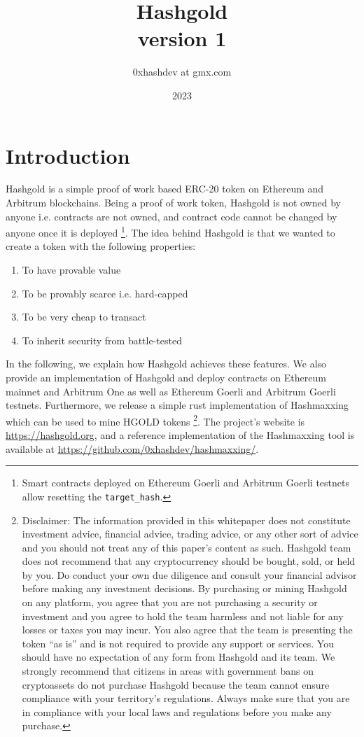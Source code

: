 \documentclass[12pt, a4paper]{article}
\title{{\Huge Hashgold} \\
{\large version 1} }
\author{0xhashdev at gmx.com}
\date{2023}
\newcommand{\websitelink}{\href{https://hashgold.org}{https://hashgold.org}}
\newcommand{\githublink}{\href{https://github.com/0xhashdev/hashmaxxing/}{https://github.com/0xhashdev/hashmaxxing/}}
\begin{document}
\maketitle

\section{Introduction}
Hashgold is a simple proof of work based ERC-20 token on Ethereum and Arbitrum blockchains. Being a proof of work token, Hashgold is not owned by anyone i.e. contracts are not owned, and contract code cannot be changed by anyone once it is deployed \footnote{Smart contracts deployed on Ethereum Goerli and Arbitrum Goerli testnets allow resetting the \texttt{target\_hash}.}. The idea behind Hashgold is that we wanted to create a token with the following properties:
\begin{enumerate}
    \item To have provable value
    \item To be provably scarce i.e. hard-capped
    \item To be very cheap to transact
    \item To inherit security from battle-tested 
\end{enumerate}
In the following, we explain how Hashgold achieves these features. We also provide an implementation of Hashgold and deploy contracts on Ethereum mainnet and Arbitrum One as well as Ethereum Goerli and Arbitrum Goerli testnets. Furthermore, we release a simple rust implementation of Hashmaxxing which can be used to mine HGOLD tokens
\footnote{Disclaimer: The information provided in this whitepaper does not constitute investment advice, financial advice, trading advice, or any other sort of advice and you should not treat any of this paper's content as such. 
Hashgold team does not recommend that any cryptocurrency should be bought, sold, or held by you. Do conduct your own due diligence and consult your financial advisor before making any investment decisions.
By purchasing or mining Hashgold on any platform, you agree that you are not purchasing a security or investment and you agree to hold the team harmless and not liable for any losses or taxes you may incur. 
You also agree that the team is presenting the token ``as is'' and is not required to provide any support or services. 
You should have no expectation of any form from Hashgold and its team. 
We strongly recommend that citizens in areas with government bans on cryptoassets do not purchase Hashgold because the team cannot ensure compliance with your territory's regulations. 
Always make sure that you are in compliance with your local laws and regulations before you make any purchase.}.
The project's website is \websitelink, and a reference implementation of the Hashmaxxing tool is available at \githublink.
\end{document}
